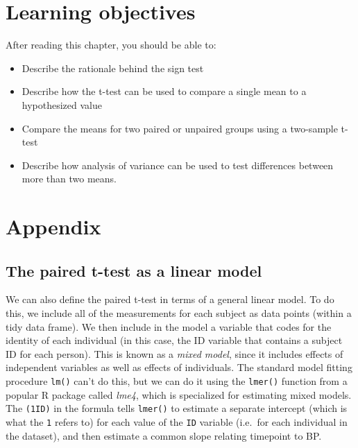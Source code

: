 \documentclass[
  12pt,
]{book}
\providecommand{\tightlist}{%
  \setlength{\itemsep}{0pt}\setlength{\parskip}{0pt}}
\begin{document}
\hypertarget{learning-objectives-14}{%
\section{Learning objectives}\label{learning-objectives-14}}

After reading this chapter, you should be able to:

\begin{itemize}
\tightlist
\item
  Describe the rationale behind the sign test
\item
  Describe how the t-test can be used to compare a single mean to a hypothesized value
\item
  Compare the means for two paired or unpaired groups using a two-sample t-test
\item
  Describe how analysis of variance can be used to test differences between more than two means.
\end{itemize}

\hypertarget{appendix-6}{%
\section{Appendix}\label{appendix-6}}

\hypertarget{the-paired-t-test-as-a-linear-model}{%
\subsection{The paired t-test as a linear model}\label{the-paired-t-test-as-a-linear-model}}

We can also define the paired t-test in terms of a general linear model. To do this, we include all of the measurements for each subject as data points (within a tidy data frame). We then include in the model a variable that codes for the identity of each individual (in this case, the ID variable that contains a subject ID for each person). This is known as a \emph{mixed model}, since it includes effects of independent variables as well as effects of individuals. The standard model fitting procedure \texttt{lm()} can't do this, but we can do it using the \texttt{lmer()} function from a popular R package called \emph{lme4}, which is specialized for estimating mixed models. The \texttt{(1\textbar{}ID)} in the formula tells \texttt{lmer()} to estimate a separate intercept (which is what the \texttt{1} refers to) for each value of the \texttt{ID} variable (i.e.~for each individual in the dataset), and then estimate a common slope relating timepoint to BP.
\end{document}
